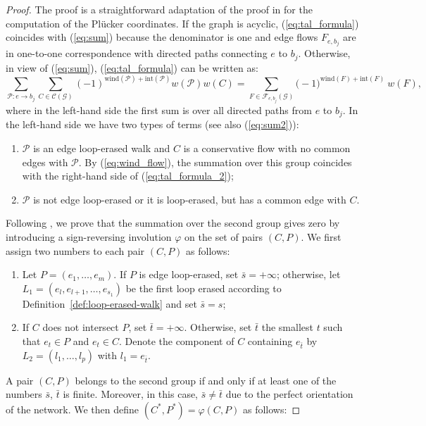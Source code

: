\documentclass[11pt]{amsart}
\theoremstyle{plain}
\numberwithin{equation}{section}
\begin{document}
\begin{proof}
The proof is a straightforward adaptation of the proof in \cite{Tal2} for the computation of the Pl\"ucker coordinates. 
If the graph is acyclic, (\ref{eq:tal_formula}) coincides with (\ref{eq:sum}) because the denominator is one and edge flows $F_{e,b_j}$ are in one-to-one correspondence with directed paths connecting $e$ to $b_j$. Otherwise, in view of  (\ref{eq:sum}), (\ref{eq:tal_formula}) can be written as:
\begin{equation}
\label{eq:tal_formula_2}
 \sum\limits_{{\mathcal P}:e\rightarrow b_{j}}  \sum\limits_{C\in {\mathcal C}(\mathcal G)}  (-1)^{\mbox{wind}({\mathcal P})+ \mbox{int}({\mathcal P})}  w({\mathcal P})  w(C)  = \sum\limits_{F\in {\mathcal F}_{e,b_j}(\mathcal G)} \big(-1\big)^{\mbox{wind}(F)+\mbox{int}(F)}\ w(F),
\end{equation}
where in the left-hand side the first sum is over all directed paths from $e$ to $b_j$. In the left-hand side we have two types of terms (see also (\ref{eq:sum2})):
\begin{enumerate}
\item $\mathcal P$ is an edge loop-erased walk and $C$ is a conservative flow with no common edges with $\mathcal P$. By (\ref{eq:wind_flow}), the summation over this group coincides with the right-hand side of (\ref{eq:tal_formula_2});
\item $\mathcal P$ is not edge loop-erased or it is loop-erased, but has a common edge with  $C$.
\end{enumerate}
Following \cite{Tal2}, we prove that the summation over the second group gives zero by introducing a sign-reversing involution $\varphi$ on the set of pairs $(C,P)$. We first assign two numbers to each pair $(C,P)$ as follows:
\begin{enumerate}
\item Let $P=(e_1,\ldots,e_m)$. If $P$ is edge loop-erased, set $\bar s=+\infty$; otherwise, let $L_1=(e_l,e_{l+1},\ldots,e_{s_1})$ be the first loop erased according to Definition~\ref{def:loop-erased-walk} and set $\bar s=s$;
\item If $C$ does not intersect $P$, set $\bar t=+\infty$. Otherwise, set $\bar t$ the smallest $t$ such that $e_t\in P$ and $e_t\in C$. Denote the component of $C$ containing $e_{\bar t}$ by $L_2=(l_1,\ldots,l_p)$ with $l_1=e_{\bar t}$. 
\end{enumerate}
A pair $(C,P)$ belongs to the second group if and only if at least one of the numbers $\bar s$, $\bar t$ is finite. Moreover, in this case, $\bar s\ne \bar t$  due to the perfect orientation of the network. We then define $(C^*,P^*)=\varphi(C,P)$ as follows:

\end{proof}
\end{document}
